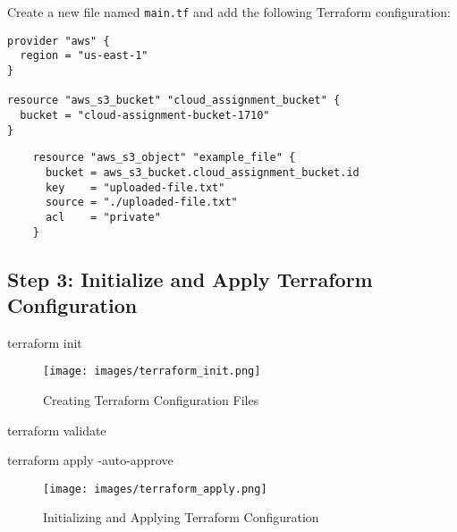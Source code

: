 \documentclass{article}
\begin{document}
Create a new file named \texttt{main.tf} and add the following Terraform configuration:

\begin{tcolorbox}[colback=gray!10, colframe=black, title=Terraform Configuration]
\begin{verbatim}
provider "aws" {
  region = "us-east-1"
}

resource "aws_s3_bucket" "cloud_assignment_bucket" {
  bucket = "cloud-assignment-bucket-1710"
}
\end{verbatim}
\end{tcolorbox}

\begin{tcolorbox}[colback=gray!10, colframe=black, title=Uploading file to S3]
  \begin{verbatim}
    resource "aws_s3_object" "example_file" {
      bucket = aws_s3_bucket.cloud_assignment_bucket.id
      key    = "uploaded-file.txt"
      source = "./uploaded-file.txt"
      acl    = "private"
    }
  \end{verbatim}
  \end{tcolorbox}

\subsection{Step 3: Initialize and Apply Terraform Configuration}

\begin{tcolorbox}[colback=gray!10, colframe=black, title=Initialize Terraform]
terraform init
\end{tcolorbox}

\begin{figure}[H]
  \centering
  \texttt{[image: images/terraform\_init.png]}
  \caption{Creating Terraform Configuration Files}
  \label{fig:terraform_config}
\end{figure}


\begin{tcolorbox}[colback=gray!10, colframe=black, title=Validate Terraform Configuration]
terraform validate
\end{tcolorbox}

\begin{tcolorbox}[colback=gray!10, colframe=black, title=Apply Terraform Configuration]
terraform apply -auto-approve
\end{tcolorbox}

\begin{figure}[H]
  \centering
  \texttt{[image: images/terraform\_apply.png]}
  \caption{Initializing and Applying Terraform Configuration}
  \label{fig:terraform_apply}
\end{figure}
\end{document}
